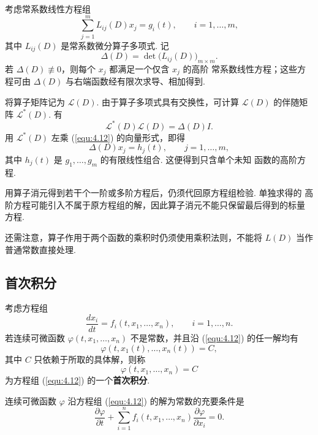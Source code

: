 \begin{thm}\label{thm:4.2.1}
考虑常系数线性方程组
\begin{equation}\label{equ:4.11}
\sum_{j=1}^{m}L_{ij}(D)x_j=g_i(t),
\qquad i=1,\ldots,m,
\end{equation}
其中 $L_{ij}(D)$ 是常系数微分算子多项式. 记
\[
\Delta(D)=\det\bigl(L_{ij}(D)\bigr)_{m\times m}.
\]
若 $\Delta(D)\not\equiv0$，则每个 $x_j$ 都满足一个仅含 $x_j$ 的高阶
常系数线性方程；这些方程可由 $\Delta(D)$ 与右端函数经有限次求导、相加得到.
\end{thm}

\begin{pf1}
将算子矩阵记为 $\mathcal L(D)$. 由于算子多项式具有交换性，可计算
$\mathcal L(D)$ 的伴随矩阵
$\mathcal L^*(D)$. 有
\[
\mathcal L^*(D)\mathcal L(D)
=\Delta(D)I.
\]
用 $\mathcal L^*(D)$ 左乘 (\ref{equ:4.12}) 的向量形式，即得
\[
\Delta(D)x_j=h_j(t),\qquad j=1,\ldots,m,
\]
其中 $h_j(t)$ 是 $g_1,\ldots,g_m$ 的有限线性组合. 这便得到只含单个未知
函数的高阶方程.
\end{pf1}

\begin{rmk}
用算子消元得到若干个一阶或多阶方程后，仍须代回原方程组检验. 单独求得的
高阶方程可能引入不属于原方程组的解，因此算子消元不能只保留最后得到的标量
方程.
\end{rmk}

还需注意，算子作用于两个函数的乘积时仍须使用乘积法则，不能将 $L(D)$ 当作
普通常数直接处理.

\subsection{首次积分}

\begin{deff}[(首次积分)]
考虑方程组
\begin{equation}\label{equ:4.12}
\frac{dx_i}{dt}=f_i(t,x_1,\ldots,x_n),\qquad i=1,\ldots,n.
\end{equation}
若连续可微函数 $\varphi(t,x_1,\ldots,x_n)$ 不是常数，并且沿
(\ref{equ:4.12}) 的任一解均有
\[
\varphi(t,x_1(t),\ldots,x_n(t))=C,
\]
其中 $C$ 只依赖于所取的具体解，则称
\[
\varphi(t,x_1,\ldots,x_n)=C
\]
为方程组 (\ref{equ:4.12}) 的一个\textbf{首次积分}.
\end{deff}

\begin{thm}\label{thm:4.2.2}
连续可微函数 $\varphi$ 沿方程组 (\ref{equ:4.12}) 的解为常数的充要条件是
\begin{equation}\label{equ:4.13}
\frac{\partial\varphi}{\partial t}
+\sum_{i=1}^{n}f_i(t,x_1,\ldots,x_n)
\frac{\partial\varphi}{\partial x_i}=0.
\end{equation}
\end{thm}

